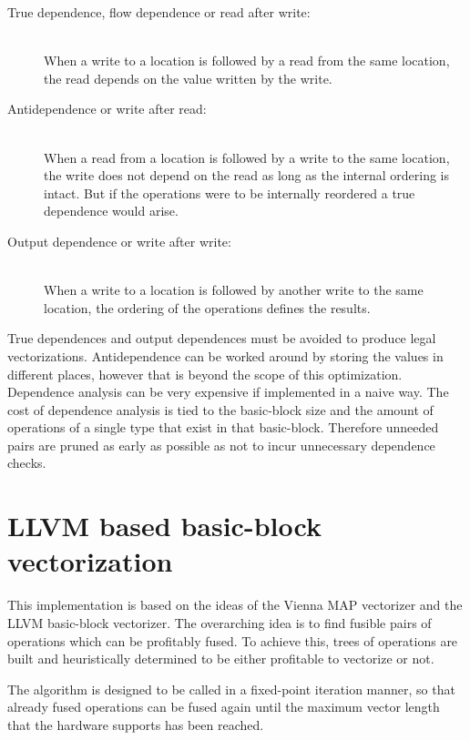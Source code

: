 \documentclass[12pt,a4paper,onecolumn,twoside,openright]{report}
\begin{document}
\begin{description}
\item[True dependence, flow dependence or read after write:] \hfill \\
When a write to a location is followed by a read from the same location, the read depends on the value written by the write.

\item[Antidependence or write after read:] \hfill \\
When a read from a location is followed by a write to the same location, the write does not depend on the read as long as the internal ordering is intact. But if the operations were to be internally reordered a true dependence would arise.

\item[Output dependence or write after write:] \hfill \\
When a write to a location is followed by another write to the same location, the ordering of the operations defines the results.
\end{description}

True dependences and output dependences must be avoided to produce legal vectorizations. Antidependence can be worked around by storing the values in different places, however that is beyond the scope of this optimization. Dependence analysis can be very expensive if implemented in a naive way. The cost of dependence analysis is tied to the basic-block size and the amount of operations of a single type that exist in that basic-block. Therefore unneeded pairs are pruned as early as possible as not to incur unnecessary dependence checks.



\section{LLVM based basic-block vectorization}
This implementation is based on the ideas of the Vienna MAP vectorizer\cite{lorenz2005vectorization} and the LLVM basic-block vectorizer\cite{finkel2012bbvectorize}. The overarching idea is to find fusible pairs of operations which can be profitably fused. To achieve this, trees of operations are built and heuristically determined to be either profitable to vectorize or not. 

The algorithm is designed to be called in a fixed-point iteration manner, so that already fused operations can be fused again until the maximum vector length that the hardware supports has been reached.
\end{document}
